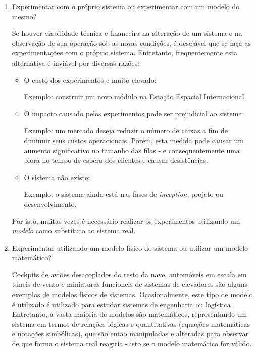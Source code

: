 \begin{enumerate}
\item Experimentar com o próprio sistema ou experimentar com um modelo do mesmo?

Se houver viabilidade técnica e financeira na alteração de um sistema e na
observação de sua operação sob as novas condições, é desejável que se faça as
experimentações com o próprio sistema. Entretanto, frequentemente esta
alternativa é inviável por diversas razões:

\begin{itemize}
  \item O custo dos experimentos é muito elevado:

  Exemplo: construir um novo módulo na Estação Espacial Internacional.

  \item O impacto causado pelos experimentos pode ser prejudicial ao sistema:

  Exemplo: um mercado deseja reduzir o número de caixas a fim de diminuir seus
custos operacionais. Porém, esta medida pode causar um aumento significativo no
tamanho das filas - e consequentemente uma piora no tempo de espera dos clientes
e causar desistências.

  \item O sistema não existe:

  Exemplo: o sistema ainda está nas fases de \textit{inception}, projeto ou desenvolvimento.
\end{itemize}

Por isto, muitas vezes é necessário realizar os experimentos utilizando um \textit{modelo} como substituto ao sistema real.

\item Experimentar utilizando um modelo físico do sistema ou utilizar um modelo matemático?

Cockpits de aviões desacoplados do resto da nave, automóveis em escala em túneis de vento e miniaturas funcioneis de sistemas de elevadores são alguns exemplos de modelos físicos de sistemas. Ocasionalmente, este tipo de modelo é utilizado é utilizado para estudar sistemas de engenharia ou logística \cite{Law}. Entretanto, a vasta maioria de modelos são matemáticos, representando um sistema em termos de relações lógicas e quantitativas (equações matemáticas e notações simbólicas), que são então manipuladas e alteradas para observar de que forma o sistema real reagiria - isto se o modelo matemático for válido.


\end{enumerate}
